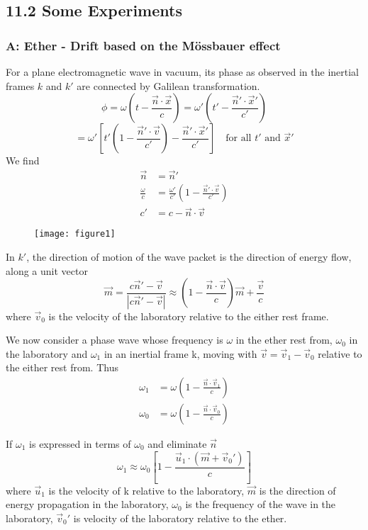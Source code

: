 \documentclass{article}
\begin{document}
	\subsection*{11.2 Some Experiments}
	\subsubsection*{A: Ether - Drift based on the M\"{o}ssbauer effect}
	For a plane electromagnetic wave in vacuum, its phase as observed in the inertial frames $k$ and $k'$ are connected by Galilean transformation.
	\[ \phi = \omega \left( t - \frac{\vec{n} \cdot \vec{x}}{c} \right) = \omega' \left( t' - \frac{\vec{n}' \cdot \vec{x}'}{c'} \right) \]
	\[ = \omega' \left[ t' \left( 1 - \frac{\vec{n}' \cdot \vec{v}}{c'} \right) - \frac{\vec{n}' \cdot \vec{x}'}{c'} \right] \quad \text{for all } t' \text{ and } \vec{x}' \]
	We find
	\begin{align*}
		\vec{n} &= \vec{n}' \\
		\frac{\omega}{c} &= \frac{\omega'}{c'} (1 - \frac{\vec{n}' \cdot \vec{v}}{c'}) \\
		c' &= c - \vec{n} \cdot \vec{v}
	\end{align*}
	
	\begin{figure}[h]
		\centering
		\texttt{[image: figure1]}
		\caption{}
		\label{fig:figure1}
	\end{figure}
	
	In $k'$, the direction of motion of the wave packet is the direction of energy flow, along a unit vector
	\[ \vec{m} = \frac{c\vec{n}' - \vec{v}}{|c\vec{n}' - \vec{v}|} \approx (1 - \frac{\vec{n} \cdot \vec{v}}{c})\vec{m} + \frac{\vec{v}}{c} \]
	where $\vec{v}_0$ is the velocity of the laboratory relative to the either rest frame.
	
	We now consider a phase wave whose frequency is $\omega$ in the ether rest from, $\omega_0$ in the laboratory and $\omega_1$ in an inertial frame k, moving with $\vec{v} = \vec{v}_1 - \vec{v}_0$ relative to the either rest from. Thus
	\begin{align*}
		\omega_1 &= \omega \left( 1 - \frac{\vec{n} \cdot \vec{v}_1}{c} \right) \\
		\omega_0 &= \omega \left( 1 - \frac{\vec{n} \cdot \vec{v}_0}{c} \right)
	\end{align*}
	
	If $\omega_1$ is expressed in terms of $\omega_0$ and eliminate $\vec{n}$
	\[ \omega_1 \approx \omega_0 \left[ 1 - \frac{\vec{u}_1 \cdot (\vec{m} + \vec{v}_0')}{c} \right] \]
	where $\vec{u}_1$ is the velocity of k relative to the laboratory, $\vec{m}$ is the direction of energy propagation in the laboratory, $\omega_0$ is the frequency of the wave in the laboratory, $\vec{v}_0'$ is velocity of the laboratory relative to the ether.
	
\end{document}
